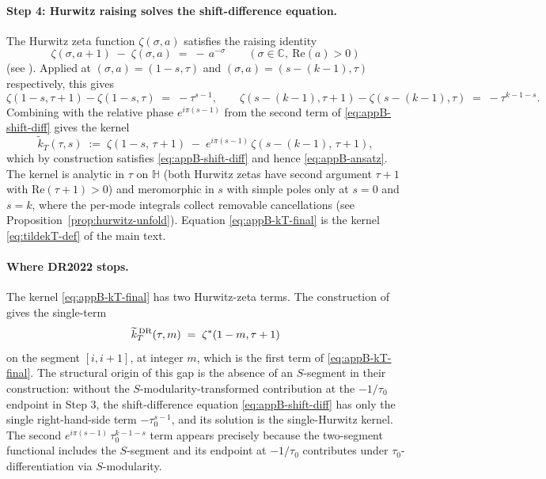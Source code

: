 \documentclass[11pt]{article}
\numberwithin{equation}{section}  %
\newcommand{\HH}{\mathbb{H}}
\newcommand{\CC}{\mathbb{C}}
\begin{document}
\paragraph{Step 4: Hurwitz raising solves the shift-difference equation.}
The Hurwitz zeta function $\zeta(\sigma, a)$ satisfies the raising
identity
\begin{equation}\label{eq:appB-hurwitz-raising}
  \zeta(\sigma, a + 1) \;-\; \zeta(\sigma, a) \;=\; -\,a^{-\sigma}
  \qquad (\sigma \in \CC,\ \mathrm{Re}(a) > 0)
\end{equation}
(see \cite[\S25.11.3]{DLMF}).  Applied at $(\sigma, a) = (1 - s, \tau)$
and $(\sigma, a) = (s - (k - 1), \tau)$ respectively, this gives
\begin{equation}
  \zeta(1 - s, \tau + 1) - \zeta(1 - s, \tau) \;=\; -\tau^{s-1},
  \qquad
  \zeta(s - (k - 1), \tau + 1) - \zeta(s - (k - 1), \tau)
  \;=\; -\tau^{k - 1 - s}.
\end{equation}
Combining with the relative phase $e^{i\pi(s-1)}$ from the second
term of \eqref{eq:appB-shift-diff} gives the kernel
\begin{equation}\label{eq:appB-kT-final}
  \widetilde{k}_T(\tau, s)
  \;:=\; \zeta(1 - s,\, \tau + 1)
  \;-\; e^{i\pi(s-1)}\,\zeta(s - (k - 1),\, \tau + 1),
\end{equation}
which by construction satisfies \eqref{eq:appB-shift-diff} and hence
\eqref{eq:appB-ansatz}.  The kernel is analytic in $\tau$ on $\HH$
(both Hurwitz zetas have second argument $\tau + 1$ with
$\mathrm{Re}(\tau + 1) > 0$) and meromorphic in $s$ with simple poles
only at $s = 0$ and $s = k$, where the per-mode integrals collect
removable cancellations (see Proposition~\ref{prop:hurwitz-unfold}).
Equation \eqref{eq:appB-kT-final} is the kernel
\eqref{eq:tildekT-def} of the main text.

\paragraph{Where DR2022 stops.}
The kernel \eqref{eq:appB-kT-final} has two Hurwitz-zeta terms.  The
construction of \cite[Thm.~1.2]{DR2022} gives the single-term
\begin{equation}
  \widetilde{k}_T^{\,\rm DR}(\tau, m)
  \;=\; \zeta^*(1 - m, \tau + 1)
\end{equation}
on the segment $[i, i+1]$, at integer $m$, which is the first term of
\eqref{eq:appB-kT-final}.  The structural origin of this gap is the
absence of an $S$-segment in their construction: without the
$S$-modularity-transformed contribution at the $-1/\tau_0$ endpoint
in Step 3, the shift-difference equation \eqref{eq:appB-shift-diff}
has only the single right-hand-side term $-\tau_0^{s-1}$, and its
solution is the single-Hurwitz kernel.  The second
$e^{i\pi(s-1)}\,\tau_0^{k-1-s}$ term appears precisely because the
two-segment functional includes the $S$-segment and its endpoint at
$-1/\tau_0$ contributes under $\tau_0$-differentiation via
$S$-modularity.
\end{document}
